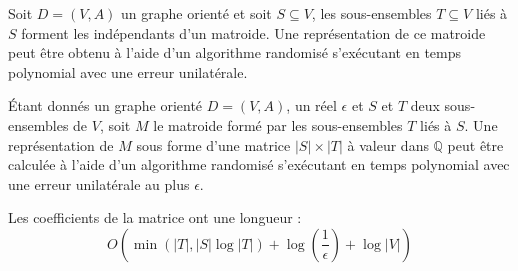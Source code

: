 \documentclass[9pt]{beamer}
\begin{document}
\begin{frame}
    \begin{thrm}[Marx, 2007]
        Soit $D = (V, A)$ un graphe orienté et soit $S \subseteq V$, les sous-ensembles $T \subseteq
        V$ liés à $S$ forment les indépendants d'un matroide. Une représentation de ce matroide peut
        être obtenu à l'aide d'un algorithme randomisé s'exécutant en temps polynomial avec une
        erreur unilatérale.
    \end{thrm}

    \pause
    \vfill

    \begin{corol}
        Étant donnés un graphe orienté $D = (V, A)$, un réel $\epsilon$ et $S$ et $T$ deux
        sous-ensembles de $V$, soit $M$ le matroide formé par les sous-ensembles $T$ liés à $S$. Une
        représentation de $M$ sous forme d'une matrice $|S| \times |T|$ à valeur dans $\mathbb{Q}$
        peut être calculée à l'aide d'un algorithme randomisé s'exécutant en temps polynomial avec
        une erreur unilatérale au plus $\epsilon$.
    \end{corol}

    \pause
    \vfill

    \begin{rmq}
        Les coefficients de la matrice ont une longueur : \[
            O(\min(|T|, |S| \log |T|) + \log  \left ( \frac{1}{\epsilon} \right ) + \log |V| )
        \]
    \end{rmq}
\end{frame}
\end{document}
